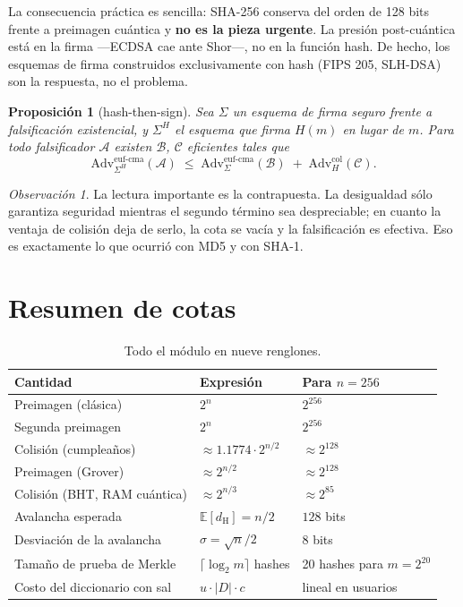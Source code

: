 \documentclass[11pt,a4paper]{article}
\theoremstyle{definition}
\theoremstyle{plain}
\newtheorem{proposicion}{Proposición}
\theoremstyle{remark}
\newtheorem*{observacion}{Observación}
\newcommand{\dH}{d_{\mathrm{H}}}
\newcommand{\Adv}{\mathrm{Adv}}
\begin{document}
La consecuencia práctica es sencilla: SHA-256 conserva del orden de 128 bits
frente a preimagen cuántica y \textbf{no es la pieza urgente}. La presión
post-cuántica está en la firma ---ECDSA cae ante Shor---, no en la función hash.
De hecho, los esquemas de firma construidos exclusivamente con hash (FIPS 205,
SLH-DSA) son la respuesta, no el problema.

\begin{proposicion}[hash-then-sign]
Sea $\Sigma$ un esquema de firma seguro frente a falsificación existencial, y
$\Sigma^{H}$ el esquema que firma $H(m)$ en lugar de $m$. Para todo falsificador
$\mathcal{A}$ existen $\mathcal{B}$, $\mathcal{C}$ eficientes tales que
\[
  \Adv^{\text{euf-cma}}_{\Sigma^{H}}(\mathcal{A}) \;\le\;
  \Adv^{\text{euf-cma}}_{\Sigma}(\mathcal{B}) \;+\;
  \Adv^{\text{col}}_{H}(\mathcal{C}).
\]
\end{proposicion}

\begin{observacion}
La lectura importante es la contrapuesta. La desigualdad sólo garantiza seguridad
mientras el segundo término sea despreciable; en cuanto la ventaja de colisión
deja de serlo, la cota se vacía y la falsificación es efectiva. Eso es
exactamente lo que ocurrió con MD5 y con SHA-1.
\end{observacion}

\clearpage
\appendix
\section{Resumen de cotas}

\begin{table}[htbp]
\centering\small
\caption{Todo el módulo en nueve renglones.}
\begin{tabular}{@{}l l l@{}}
\toprule
\textbf{Cantidad} & \textbf{Expresión} & \textbf{Para $n = 256$}\\
\midrule
Preimagen (clásica)        & $2^{n}$                  & $2^{256}$\\
Segunda preimagen          & $2^{n}$                  & $2^{256}$\\
Colisión (cumpleaños)      & $\approx 1.1774\cdot 2^{n/2}$ & $\approx 2^{128}$\\
Preimagen (Grover)         & $\approx 2^{n/2}$        & $\approx 2^{128}$\\
Colisión (BHT, RAM cuántica) & $\approx 2^{n/3}$      & $\approx 2^{85}$\\
Avalancha esperada         & $\mathbb{E}[\dH] = n/2$  & $128$ bits\\
Desviación de la avalancha & $\sigma = \sqrt{n}/2$    & $8$ bits\\
Tamaño de prueba de Merkle & $\lceil\log_2 m\rceil$ hashes & 20 hashes para $m = 2^{20}$\\
Costo del diccionario con sal & $u\cdot|D|\cdot c$    & lineal en usuarios\\
\bottomrule
\end{tabular}
\end{table}
\end{document}
